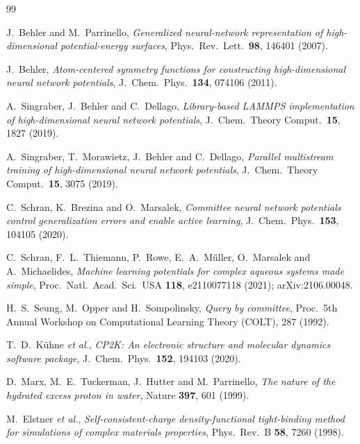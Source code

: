 \documentclass[11pt,a4paper]{article}
\begin{document}
\begin{thebibliography}{99}
\small

 J.~Behler and M.~Parrinello,
  \emph{Generalized neural-network representation of high-dimensional
  potential-energy surfaces}, Phys.\ Rev.\ Lett.\ \textbf{98}, 146401 (2007).

 J.~Behler,
  \emph{Atom-centered symmetry functions for constructing high-dimensional
  neural network potentials}, J.\ Chem.\ Phys.\ \textbf{134}, 074106 (2011).

 A.~Singraber, J.~Behler and C.~Dellago,
  \emph{Library-based LAMMPS implementation of high-dimensional neural network
  potentials}, J.\ Chem.\ Theory Comput.\ \textbf{15}, 1827 (2019).

 A.~Singraber, T.~Morawietz, J.~Behler and C.~Dellago,
  \emph{Parallel multistream training of high-dimensional neural network
  potentials}, J.\ Chem.\ Theory Comput.\ \textbf{15}, 3075 (2019).

 C.~Schran, K.~Brezina and O.~Marsalek,
  \emph{Committee neural network potentials control generalization errors and
  enable active learning}, J.\ Chem.\ Phys.\ \textbf{153}, 104105 (2020).

 C.~Schran, F.~L.~Thiemann, P.~Rowe, E.~A.~M\"uller,
  O.~Marsalek and A.~Michaelides,
  \emph{Machine learning potentials for complex aqueous systems made simple},
  Proc.\ Natl.\ Acad.\ Sci.\ USA \textbf{118}, e2110077118 (2021);
  arXiv:2106.00048.

 H.~S.~Seung, M.~Opper and H.~Sompolinsky,
  \emph{Query by committee}, Proc.\ 5th Annual Workshop on Computational
  Learning Theory (COLT), 287 (1992).

 T.~D.~K\"uhne \emph{et al.},
  \emph{CP2K: An electronic structure and molecular dynamics software
  package}, J.\ Chem.\ Phys.\ \textbf{152}, 194103 (2020).

 D.~Marx, M.~E.~Tuckerman, J.~Hutter and M.~Parrinello,
  \emph{The nature of the hydrated excess proton in water},
  Nature \textbf{397}, 601 (1999).

 M.~Elstner \emph{et al.},
  \emph{Self-consistent-charge density-functional tight-binding method for
  simulations of complex materials properties}, Phys.\ Rev.\ B \textbf{58},
  7260 (1998).


\end{thebibliography}
\end{document}
